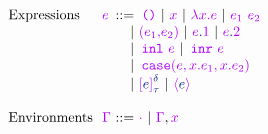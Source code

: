 \[\begin{array}{@{}l@{~~}l@{~}r@{}l@{}}
\mbox{Expressions} & \texp & \bnfdef & \tunit \bnfalt \tvar{x} \bnfalt \tabs{\tvar{x}}{\texp} \bnfalt \tapp{\texp_{\target{1}}}{\texp_{\target{2}}} \\
& & \bnfalt & \tpair{\texp_{\target{1}}}{\texp_{\target{2}}} \bnfalt \tfst{\texp} \bnfalt \tsnd{\texp} \\
& & \bnfalt & \tinl{\texp} \bnfalt \tinr{\texp} \\
& & \bnfalt & \tcasex{\texp}{\texp_{\target{1}}}{\texp_{\target{2}}} \\
& & \bnfalt & \talien{\sexp}{\stau}{\sdelta} \bnfalt
\topaque{\sexp}\\
& & & \\
\mbox{Environments} & \tenv & \bnfdef & \tenvemp \bnfalt \tenvext{\tenv}{\tvar{x}} \\

\end{array}\]
